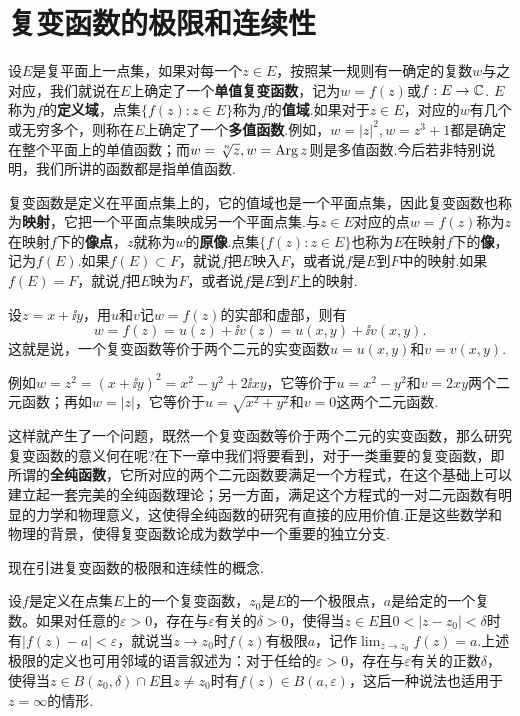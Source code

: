 \section{复变函数的极限和连续性\label{sec1.7}}
设$E$是复平面上一点集，如果对每一个$z\in E$，按照某一规则有一确定的复数$w$与之对应，我们就说在$E$上确定了一个\textbf{单值复变函数}，记为$w=f(z)$或$f:E\to\mathbb C$. $E$称为$f$的\textbf{定义域}，点集$\{f(z):z\in E\}$称为$f$的\textbf{值域}.如果对于$z\in E$，对应的$w$有几个或无穷多个，则称在$E$上确定了一个\textbf{多值函数}.例如，$w=|z|^2,w=z^3+1$都是确定在整个平面上的单值函数；而$w=\sqrt[\leftroot{-1}\uproot{2} n]z,w=\Arg z$则是多值函数.今后若非特别说明，我们所讲的函数都是指单值函数.

复变函数是定义在平面点集上的，它的值域也是一个平面点集，因此复变函数也称为\textbf{映射}，它把一个平面点集映成另一个平面点集.与$z\in E$对应的点$w=f(z)$称为$z$在映射$f$下的\textbf{像点}，$z$就称为$w$的\textbf{原像}.点集$\{f(z):z\in E\}$也称为$E$在映射$f$下的\textbf{像}，记为$f(E)$.如果$f(E)\subset F$，就说$f$把$E$映入$F$，或者说$f$是$E$到$F$中的映射.如果$f(E)=F$，就说$f$把$E$映为$F$，或者说$f$是$E$到$F$上的映射.

设$z=x+\ii y$，用$u$和$v$记$w=f(z)$的实部和虚部，则有
\[
  w = f(z) = u(z)+\ii v(z) = u(x,y)+\ii v(x,y).
\]
这就是说，一个复变函数等价于两个二元的实变函数$u=u(x,y)$和$v=v(x,y)$.

例如$w=z^2=(x+\ii y)^2=x^2-y^2+2\ii xy$，它等价于$u=x^2-y^2$和$v=2xy$两个二元函数；再如$w=|z|$，它等价于$u=\sqrt{x^2+y^2}$和$v=0$这两个二元函数.

这样就产生了一个问题，既然一个复变函数等价于两个二元的实变函数，那么研究复变函数的意义何在呢?在下一章中我们将要看到，对于一类重要的复变函数，即所谓的\textbf{全纯函数}，它所对应的两个二元函数要满足一个方程式，在这个基础上可以建立起一套完美的全纯函数理论；另一方面，满足这个方程式的一对二元函数有明显的力学和物理意义，这使得全纯函数的研究有直接的应用价值.正是这些数学和物理的背景，使得复变函数论成为数学中一个重要的独立分支.

现在引进复变函数的极限和连续性的概念.

设$f$是定义在点集$E$上的一个复变函数，$z_0$是$E$的一个极限点，$a$是给定的一个复数。如果对任意的$\varepsilon>0$，存在与$\varepsilon$有关的$\delta>0$，使得当$z\in E$且$0<|z-z_0|<\delta$时有$|f(z)-a|<\varepsilon$，就说当$z\to z_0$时$f(z)$有极限$a$，记作$\lim_{z\to z_0}f(z)=a$.上述极限的定义也可用邻域的语言叙述为：对于任给的$\varepsilon>0$，存在与$\varepsilon$有关的正数$\delta$，使得当$z\in B(z_0,\delta)\cap E$且$z\ne z_0$时有$f(z)\in B(a,\varepsilon)$，这后一种说法也适用于$z=\infty$的情形.


